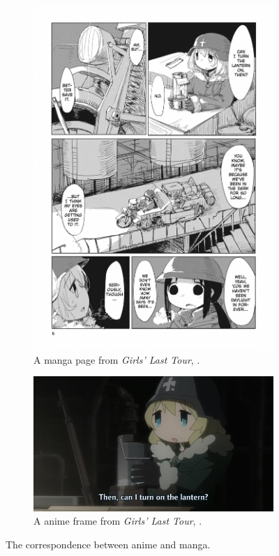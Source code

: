 \documentclass[11pt, oneside]{article}
\begin{document}
\begin{figure}[h!]
    \centering
    \begin{subfigure}[h]{0.49 \textwidth}
      \includegraphics[scale=0.15,trim={60px 50px 60px 60px},clip]{page}
      \caption{A manga page from \textit{Girls' Last Tour}, \cite{tour1}.}
    \end{subfigure}
    \hfill
    \begin{subfigure}[h]{0.49 \textwidth}
      \includegraphics[scale=0.14,trim={180px 0 300px 0},clip]{frame}
      \caption{A anime frame from \textit{Girls' Last Tour}, \cite{tour}.}
    \end{subfigure} 
    \caption{The correspondence between anime and manga.}
    \label{fig:dual}
\end{figure}
\end{document}
